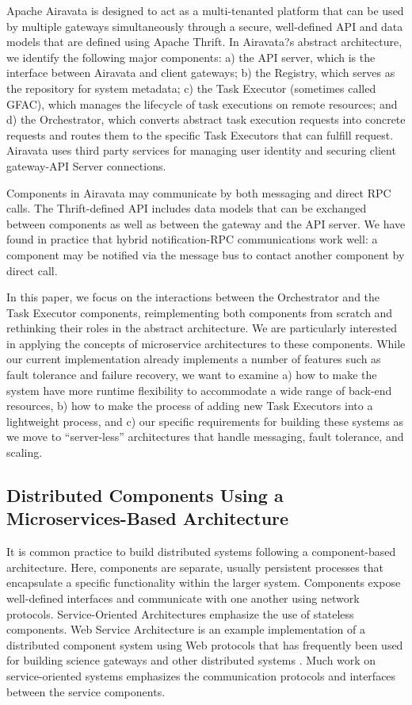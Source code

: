 \documentclass[review]{elsarticle}
\begin{document}
Apache Airavata is designed to act as a multi-tenanted platform that can be used by multiple gateways simultaneously through a secure, well-defined API and data models that are defined using Apache Thrift.   In Airavata?s abstract architecture, we identify the following major components: a) the API server, which is the interface between Airavata and client gateways; b) the Registry, which serves as the repository for system metadata; c) the Task Executor (sometimes called GFAC), which manages the lifecycle of task executions on remote resources; and d) the Orchestrator, which converts abstract task execution requests into concrete requests and routes them to the specific Task Executors that can fulfill request.  Airavata uses third party services for managing user identity and securing client gateway-API Server connections.  

Components in Airavata may communicate by both messaging and direct RPC calls.  The Thrift-defined API includes data models that can be exchanged between components as well as between the gateway and the API server.  We have found in practice that hybrid notification-RPC communications work well: a component may be notified via the message bus to contact another component by direct call.

In this paper, we focus on the interactions between the Orchestrator and the Task Executor components, reimplementing both components from scratch and rethinking their roles in the abstract architecture. We are particularly interested in applying the concepts of microservice architectures to these components.  While our current implementation already implements a number of features such as fault tolerance and failure recovery, we want to examine a) how to make the system have more runtime flexibility to accommodate a wide range of back-end resources, b) how to make the process of adding new Task Executors into a lightweight process, and c) our specific requirements for building these systems as we move to ``server-less'' architectures that handle messaging, fault tolerance, and scaling.

\subsection{Distributed Components Using a Microservices-Based Architecture}
It is common practice to build distributed systems following a component-based architecture. Here, components are separate, usually persistent processes that encapsulate a specific functionality within the larger system. Components expose well-defined interfaces and communicate with one another using network protocols.  Service-Oriented Architectures emphasize the use of stateless components. Web Service Architecture is an example implementation of a distributed component system using Web protocols that has frequently been used for building science gateways and other distributed systems \cite{kacsuk2012ws}\cite{marzolla2007open}.   Much work on service-oriented systems emphasizes the communication protocols and interfaces between the service components. 
\end{document}

